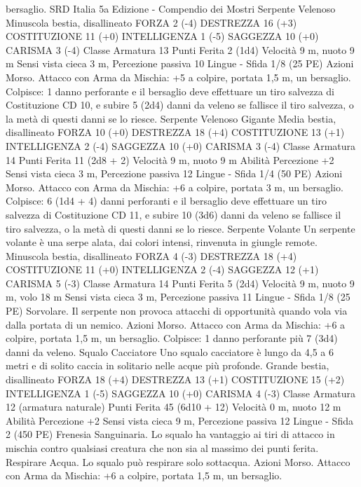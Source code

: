 \begin{multicols}{2}
bersaglio.
SRD Italia 5a Edizione - Compendio dei Mostri
Serpente Velenoso
Minuscola bestia, disallineato
FORZA 2 (-4)
DESTREZZA 16 (+3)
COSTITUZIONE 11 (+0)
INTELLIGENZA 1 (-5)
SAGGEZZA 10 (+0)
CARISMA 3 (-4)
Classe Armatura 13
Punti Ferita 2 (1d4)
Velocità 9 m, nuoto 9 m
Sensi vista cieca 3 m, Percezione passiva 10
Lingue -
Sfida 1/8 (25 PE)
Azioni
Morso. Attacco con Arma da Mischia: +5 a colpire, portata 1,5
m, un bersaglio.
Colpisce: 1 danno perforante e il bersaglio deve effettuare un tiro
salvezza di Costituzione CD 10, e subire 5 (2d4) danni da veleno
se fallisce il tiro salvezza, o la metà di questi danni se lo riesce.
Serpente Velenoso
Gigante
Media bestia, disallineato
FORZA 10 (+0)
DESTREZZA 18 (+4)
COSTITUZIONE 13 (+1)
INTELLIGENZA 2 (-4)
SAGGEZZA 10 (+0)
CARISMA 3 (-4)
Classe Armatura 14
Punti Ferita 11 (2d8 + 2)
Velocità 9 m, nuoto 9 m
Abilità Percezione +2
Sensi vista cieca 3 m, Percezione passiva 12
Lingue -
Sfida 1/4 (50 PE)
Azioni
Morso. Attacco con Arma da Mischia: +6 a colpire, portata 3 m,
un bersaglio.
Colpisce: 6 (1d4 + 4) danni perforanti e il bersaglio deve
effettuare un tiro salvezza di Costituzione CD 11, e subire 10
(3d6) danni da veleno se fallisce il tiro salvezza, o la metà di
questi danni se lo riesce.
Serpente Volante
Un serpente volante è una serpe alata, dai colori
intensi, rinvenuta in giungle remote.
Minuscola bestia, disallineato
FORZA 4 (-3)
DESTREZZA 18 (+4)
COSTITUZIONE 11 (+0)
INTELLIGENZA 2 (-4)
SAGGEZZA 12 (+1)
CARISMA 5 (-3)
Classe Armatura 14
Punti Ferita 5 (2d4)
Velocità 9 m, nuoto 9 m, volo 18 m
Sensi vista cieca 3 m, Percezione passiva 11
Lingue -
Sfida 1/8 (25 PE)
Sorvolare. Il serpente non provoca attacchi di opportunità
quando vola via dalla portata di un nemico.
Azioni
Morso. Attacco con Arma da Mischia: +6 a colpire, portata 1,5
m, un bersaglio.
Colpisce: 1 danno perforante più 7 (3d4) danni da veleno.
Squalo Cacciatore
Uno squalo cacciatore è lungo da 4,5 a 6 metri e di
solito caccia in solitario nelle acque più profonde.
Grande bestia, disallineato
FORZA 18 (+4)
DESTREZZA 13 (+1)
COSTITUZIONE 15 (+2)
INTELLIGENZA 1 (-5)
SAGGEZZA 10 (+0)
CARISMA 4 (-3)
Classe Armatura 12 (armatura naturale)
Punti Ferita 45 (6d10 + 12)
Velocità 0 m, nuoto 12 m
Abilità Percezione +2
Sensi vista cieca 9 m, Percezione passiva 12
Lingue -
Sfida 2 (450 PE)
Frenesia Sanguinaria. Lo squalo ha vantaggio ai tiri di attacco
in mischia contro qualsiasi creatura che non sia al massimo dei
punti ferita.
Respirare Acqua. Lo squalo può respirare solo sottacqua.
Azioni
Morso. Attacco con Arma da Mischia: +6 a colpire, portata 1,5
m, un bersaglio.

\end{multicols}
